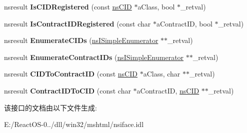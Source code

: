 \begin{DoxyCompactItemize}
\mbox{\label{interfacens_i_component_registrar_a3969cf9e8d2209d43512bef694384ae3}} 
nsresult {\bfseries Is\+C\+I\+D\+Registered} (const \hyperlink{struct___i_i_d}{ns\+C\+ID} $\ast$a\+Class, bool $\ast$\+\_\+retval)
\item 
\mbox{\label{interfacens_i_component_registrar_a8dc4d6a879ba94488ff9e9a25a9e07c3}} 
nsresult {\bfseries Is\+Contract\+I\+D\+Registered} (const char $\ast$a\+Contract\+ID, bool $\ast$\+\_\+retval)
\item 
\mbox{\label{interfacens_i_component_registrar_add9725abde92876f7d8e07bd740c042f}} 
nsresult {\bfseries Enumerate\+C\+I\+Ds} (\hyperlink{interfacens_i_simple_enumerator}{ns\+I\+Simple\+Enumerator} $\ast$$\ast$\+\_\+retval)
\item 
\mbox{\label{interfacens_i_component_registrar_aad5422aed980318e98b6a2d510dbc30c}} 
nsresult {\bfseries Enumerate\+Contract\+I\+Ds} (\hyperlink{interfacens_i_simple_enumerator}{ns\+I\+Simple\+Enumerator} $\ast$$\ast$\+\_\+retval)
\item 
\mbox{\label{interfacens_i_component_registrar_a971465315160294ac42f903a6eb1d9d6}} 
nsresult {\bfseries C\+I\+D\+To\+Contract\+ID} (const \hyperlink{struct___i_i_d}{ns\+C\+ID} $\ast$a\+Class, char $\ast$$\ast$\+\_\+retval)
\item 
\mbox{\label{interfacens_i_component_registrar_abab8b737597cfd4a27c310f01a7836df}} 
nsresult {\bfseries Contract\+I\+D\+To\+C\+ID} (const char $\ast$a\+Contract\+ID, \hyperlink{struct___i_i_d}{ns\+C\+ID} $\ast$$\ast$\+\_\+retval)
\end{DoxyCompactItemize}


该接口的文档由以下文件生成\+:\begin{DoxyCompactItemize}
\item 
E\+:/\+React\+O\+S-\/0../dll/win32/mshtml/nsiface.\+idl\end{DoxyCompactItemize}
